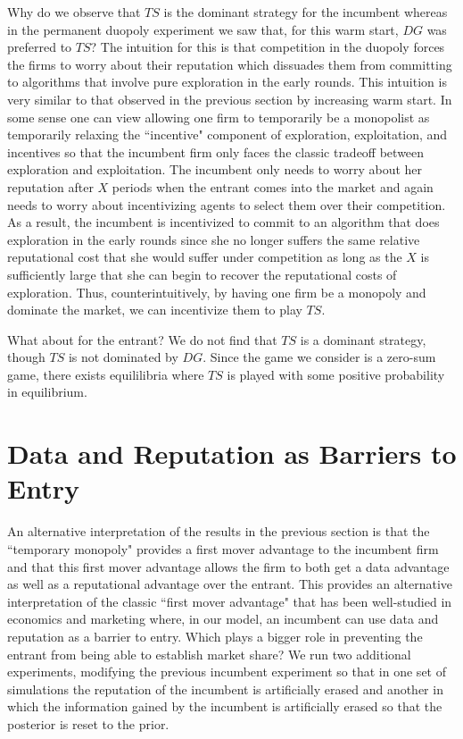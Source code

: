\documentclass{article}
\theoremstyle{definition}
\begin{document}
Why do we observe that $TS$ is the dominant strategy for the incumbent whereas in the permanent duopoly experiment we saw that, for this warm start, $DG$ was preferred to $TS$? The intuition for this is that competition in the duopoly forces the firms to worry about their reputation which dissuades them from committing to algorithms that involve pure exploration in the early rounds. This intuition is very similar to that observed in the previous section by increasing warm start. In some sense one can view allowing one firm to temporarily be a monopolist as temporarily relaxing the ``incentive" component of exploration, exploitation, and incentives so that the incumbent firm only faces the classic tradeoff between exploration and exploitation. The incumbent only needs to worry about her reputation after $X$ periods when the entrant comes into the market and again needs to worry about incentivizing agents to select them over their competition. As a result, the incumbent is incentivized to commit to an algorithm that does exploration in the early rounds since she no longer suffers the same relative reputational cost that she would suffer under competition as long as the $X$ is sufficiently large that she can begin to recover the reputational costs of exploration. Thus, counterintuitively, by having one firm be a monopoly and dominate the market, we can incentivize them to play $TS$.

What about for the entrant? We do not find that $TS$ is a dominant strategy, though $TS$ is not dominated by $DG$. Since the game we consider is a zero-sum game, there exists equililibria where $TS$ is played with some positive probability in equilibrium.

\section{Data and Reputation as Barriers to Entry}
\label{S:6}

An alternative interpretation of the results in the previous section is that the ``temporary monopoly" provides a first mover advantage to the incumbent firm and that this first mover advantage allows the firm to both get a data advantage as well as a reputational advantage over the entrant. This provides an alternative interpretation of the classic ``first mover advantage" that has been well-studied in economics and marketing \citep*{kerin1992first} where, in our model, an incumbent can use data and reputation as a barrier to entry. Which plays a bigger role in preventing the entrant from being able to establish market share? We run two additional experiments, modifying the previous incumbent experiment so that in one set of simulations the reputation of the incumbent is artificially erased and another in which the information gained by the incumbent is artificially erased so that the posterior is reset to the prior.
\end{document}
